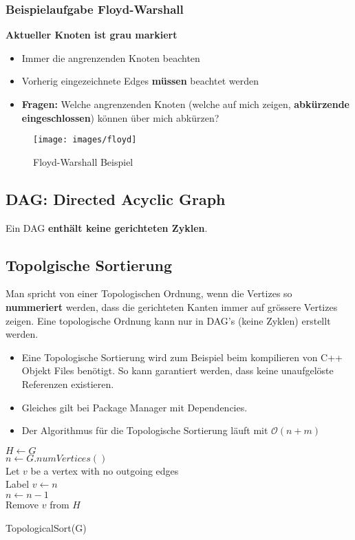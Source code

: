 \clearpage

\subsubsection{Beispielaufgabe Floyd-Warshall}
\textbf{Aktueller Knoten ist grau markiert}
\begin{itemize}
	\item Immer die angrenzenden Knoten beachten
	\item Vorherig eingezeichnete Edges \textbf{müssen} beachtet werden
	\item \textbf{Fragen: } 
		\subitem Welche angrenzenden Knoten (welche auf mich zeigen, \textbf{abkürzende eingeschlossen}) können über mich abkürzen?
\end{itemize}
\begin{figure}[h]
	\centering
	\texttt{[image: images/floyd]}
	\caption{Floyd-Warshall Beispiel}
	\label{fig:floydwarshallbeispiel}
\end{figure}
\clearpage

\subsection{DAG: Directed Acyclic Graph}
Ein DAG \textbf{enthält keine gerichteten Zyklen}.

\subsection{Topolgische Sortierung}
Man spricht von einer Topologischen Ordnung, wenn die Vertizes so \textbf{nummeriert} werden, dass die gerichteten Kanten immer auf grössere Vertizes zeigen. Eine topologische Ordnung kann nur in DAG's (keine Zyklen) erstellt werden.  
\begin{itemize}
	\item Eine Topologische Sortierung wird zum Beispiel beim kompilieren von C++ Objekt Files benötigt. So kann garantiert werden, dass keine unaufgelöste Referenzen existieren.
	\item Gleiches gilt bei Package Manager mit Dependencies.
	\item Der Algorithmus für die Topologische Sortierung läuft mit $\mathcal{O}(n+m)$
\end{itemize}

\begin{algorithm}[H]
	$H \leftarrow G$ \\
	$n \leftarrow G.numVertices()$ \\
	{
		Let $v$ be a vertex with no outgoing edges \\
		Label $v \leftarrow n$ \\
		$n \leftarrow n -1  $ \\
		Remove $v$ from $H$
	}
	\caption{TopologicalSort(G)}
\end{algorithm}

